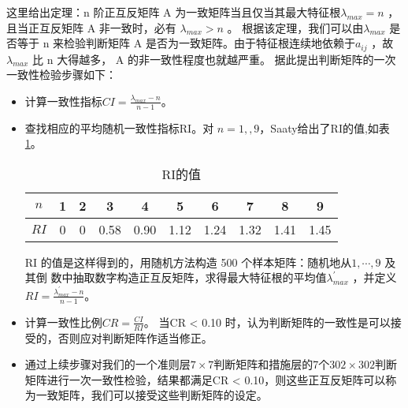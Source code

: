 \documentclass{cumcmthesis}
\begin{document}
这里给出定理：n 阶正互反矩阵 A 为一致矩阵当且仅当其最大特征根$\lambda_{max} = n$ ，且当正互反矩阵 A 非一致时，必有 $\lambda_{max}> n$ 。 根据该定理，我们可以由$\lambda_{max}$ 是否等于 n 来检验判断矩阵 A 是否为一致矩阵。由于特征根连续地依赖于$a_{ij}$ ，故 $\lambda_{max}$ 比 n 大得越多， A 的非一致性程度也就越严重。
据此提出判断矩阵的一次一致性检验步骤如下：
\begin{itemize}
    \item 计算一致性指标$CI = \frac{\lambda_{max}-n}{n-1}$。
    \item 查找相应的平均随机一致性指标RI。对 $n = 1,,9$，Saaty给出了RI的值,如表\ref{RIde}。
    \begin{table}[H]
        \label{tablesymbol}
        \centering
        \begin{tabular}{c|ccccccccc}   
        \hline 
        $n$  &  1 & 2 & 3 & 4 & 5 & 6 & 7 & 8 & 9\\
        \hline
        $RI$  &  0 & 0 & 0.58 & 0.90 & 1.12 & 1.24 & 1.32 & 1.41 & 1.45\\
        \hline
        \end{tabular}
        \caption{RI的值}
        \label{RIde}
    
    \end{table}
    RI 的值是这样得到的，用随机方法构造 500 个样本矩阵：随机地从$1,\cdots,9$ 及其倒
数中抽取数字构造正互反矩阵，求得最大特征根的平均值$\lambda^{'}_{max}$ ，并定义$RI = \frac{\lambda^{'}_{max}-n}{n-1}$。
    \item 计算一致性比例$CR = \frac{CI}{RI}$。
    当CR < 0.10 时，认为判断矩阵的一致性是可以接受的，否则应对判断矩阵作适当修正。
    \item 通过上续步骤对我们的一个准则层$7 \times 7$判断矩阵和措施层的7个$302 \times 302$判断矩阵进行一次一致性检验，结果都满足CR < 0.10，则这些正互反矩阵可以称为一致矩阵，我们可以接受这些判断矩阵的设定。 
\end{itemize}
\end{document}
